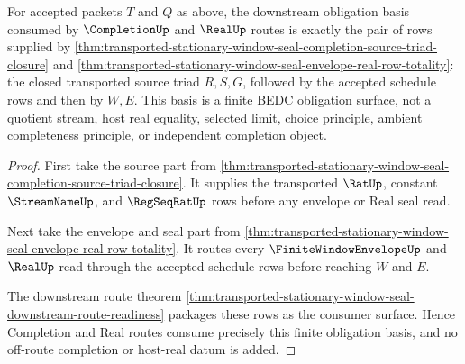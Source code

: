 \begin{theorem}
\label{thm:transported-stationary-window-seal-downstream-obligation-basis}
For accepted packets $T$ and $Q$ as above, the downstream obligation basis consumed by $\CompletionUp$ and $\RealUp$ routes is exactly the pair of rows supplied by \autoref{thm:transported-stationary-window-seal-completion-source-triad-closure} and \autoref{thm:transported-stationary-window-seal-envelope-real-row-totality}: the closed transported source triad $R,S,G$, followed by the accepted schedule rows and then by $W,E$. This basis is a finite BEDC obligation surface, not a quotient stream, host real equality, selected limit, choice principle, ambient completeness principle, or independent completion object.
\end{theorem}
\begin{proof}
First take the source part from \autoref{thm:transported-stationary-window-seal-completion-source-triad-closure}. It supplies the transported $\RatUp$, constant $\StreamNameUp$, and $\RegSeqRatUp$ rows before any envelope or Real seal read.

Next take the envelope and seal part from \autoref{thm:transported-stationary-window-seal-envelope-real-row-totality}. It routes every $\FiniteWindowEnvelopeUp$ and $\RealUp$ read through the accepted schedule rows before reaching $W$ and $E$.

The downstream route theorem \autoref{thm:transported-stationary-window-seal-downstream-route-readiness} packages these rows as the consumer surface. Hence Completion and Real routes consume precisely this finite obligation basis, and no off-route completion or host-real datum is added.
\end{proof}
